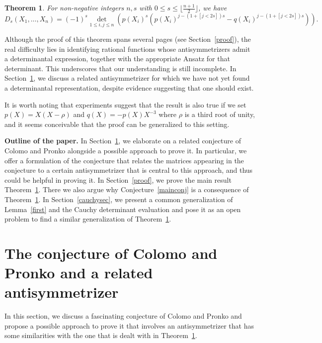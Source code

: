 \documentclass[12pt,dvipsnames]{amsart}
\newtheorem{theorem}{Theorem}
\theoremstyle{definition}
\begin{document}
\begin{theorem}
\label{antisymtodet} 
For non-negative integers $n,s$ with $0 \le s \le \lfloor \frac{n+1}{2} \rfloor$, we have 
$$
D_s(X_1,\ldots,X_n) = 
(-1)^s \det_{1 \le i,j \le n} \left( p(X_i)^s \left( p(X_i)^{j-(1+[j<2s])s}-q(X_i)^{j-(1+[j<2s])s} \right) \right).
$$
\end{theorem} 

Although the proof of this theorem spans several pages (see Section~\ref{proof}), the real difficulty lies in identifying rational functions whose antisymmetrizers admit a determinantal expression, together with the appropriate Ansatz for that determinant. This underscores that our understanding is still incomplete. In Section~\ref{colpro}, we discuss a related antisymmetrizer for which we have not yet found a determinantal representation, despite evidence suggesting that one should exist.

It is worth noting that experiments suggest that the result is also true if we set $p(X)=X(X-\rho)$ and $q(X)=-p(X)X^{-3}$ where 
$\rho$ is a third root of unity, and it seems conceivable that the proof can be generalized to this setting.

\bigskip

{\bf Outline of the paper.} In Section~\ref{colpro}, we elaborate on a related conjecture of Colomo and Pronko alongside a possible approach to prove it. In particular, we offer a formulation of the conjecture that relates the matrices appearing in the conjecture to a certain antisymmetrizer that is central to this approach, and thus could be helpful in proving it. In Section~\ref{proof}, we prove the main result Theorem~\ref{antisymtodet}. There we also argue why Conjecture~\ref{mainconj} is a consequence of Theorem~\ref{antisymtodet}.
In Section~\ref{cauchysec}, we present a common generalization of Lemma~\ref{first} and the Cauchy determinant evaluation and pose it as an open problem to find a similar generalization of Theorem~\ref{antisymtodet}.

\section{The conjecture of Colomo and Pronko and a related antisymmetrizer} 
\label{colpro}

In this section, we discuss a fascinating conjecture of Colomo and Pronko 
\cite{CP24,CP25} and propose a possible approach to prove it that involves an antisymmetrizer that has some similarities with the one that is dealt with in Theorem~\ref{antisymtodet}.
\end{document}
